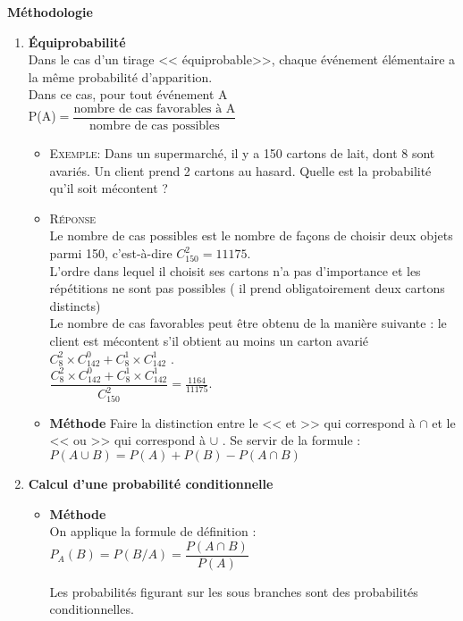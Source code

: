    
   \textbf{Méthodologie}
\begin{enumerate}
\item\textbf{Équiprobabilité}\\
 Dans le cas d'un tirage << équiprobable>>, chaque événement élémentaire a la même probabilité d'apparition.\\
Dans ce cas, pour tout événement A\\

\hspace*{4cm} P(A)$=\dfrac{\text{nombre de cas favorables à  A}}{\text{nombre de cas possibles}}  $
\begin{itemize}[label=\bf $ \ast $]
  \item \textsc{Exemple}:\; Dans un supermarché, il y a 150 cartons de lait, dont 8 sont avariés. Un client prend 2 cartons au hasard. Quelle est la probabilité
qu'il soit mécontent ?
\item  \textsc{Réponse}\\Le nombre de cas possibles est le nombre de façons de choisir deux objets parmi 150, c’est-à-dire $ C_{150}^2=11175 $.\\
L'ordre dans lequel il choisit ses cartons n'a pas d'importance et les répétitions ne sont pas possibles ( il prend obligatoirement deux cartons distincts)\\
 Le nombre de cas favorables peut être obtenu de la manière suivante : le client est mécontent s'il obtient au moins un carton avarié\; $ C_8^2\times C_{142}^0+C_8^1\times C_{142}^1 $  .\\ $ \dfrac{C_8^2\times C_{142}^0+C_8^1\times C_{142}^1   }{C_{150}^2 }=\frac{1164}{11175} $.
\item \textbf{Méthode}\; Faire la distinction entre le << et >> qui correspond à $ \cap $ et le << ou >> qui correspond à $ \cup $ . Se servir de la formule :$ P(A\cup B)=P(A)+P(B)-P(A\cap B) $
\end{itemize}
\item \textbf{Calcul d'une probabilité conditionnelle}
\begin{itemize}[label=\bf $ \ast $]
\item \textbf{Méthode}\\
On applique la formule de définition :\; $ P_A(B)=P(B/A)=\dfrac{P(A\cap B)}{P(A)} $

  Les probabilités figurant sur les sous branches sont des probabilités conditionnelles. 
 

\end{itemize}
\end{enumerate}
